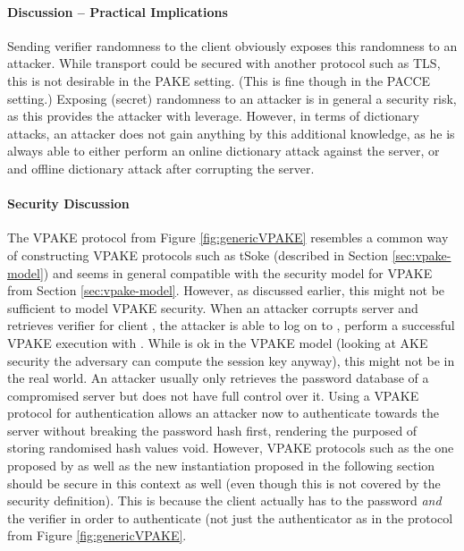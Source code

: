 \paragraph{Discussion -- Practical Implications}
Sending verifier randomness to the client obviously exposes this randomness to an attacker.
While transport could be secured with another protocol such as \ac{TLS}, this is not desirable in the \ac{PAKE} setting.
(This is fine though in the \ac{PACCE} setting.)
Exposing (secret) randomness to an attacker is in general a security risk, as this provides the attacker with leverage.
However, in terms of dictionary attacks, an attacker does not gain anything by this additional knowledge, as he is always able to either perform an online dictionary attack against the server, or and offline dictionary attack after corrupting the server.

\paragraph{Security Discussion}
The \ac{VPAKE} protocol from Figure \ref{fig:genericVPAKE} resembles a common way of constructing \ac{VPAKE} protocols such as tSoke (described in Section \ref{sec:vpake-model}) and seems in general compatible with the security model for \ac{VPAKE} from Section \ref{sec:vpake-model}.
However, as discussed earlier, this might not be sufficient to model \ac{VPAKE} security.
When an attacker corrupts server \Server and retrieves verifier \ver for client \Client, the attacker is able to log on to \Server, \ie perform a successful \ac{VPAKE} execution with \Server.
While is ok in the \ac{VPAKE} model (looking at \ac{AKE} security the adversary can compute the session key anyway), this might not be in the real world.
An attacker usually only retrieves the password database of a compromised server but does not have full control over it.
Using a \ac{VPAKE} protocol for authentication allows an attacker now to authenticate towards the server without breaking the password hash first, \ie rendering the purposed of storing randomised hash values void.
However, \ac{VPAKE} protocols such as the one proposed by \citet{BenhamoudaP13} as well as the new instantiation proposed in the following section should be secure in this context as well (even though this is not covered by the security definition).
This is because the client actually has to the password \emph{and} the verifier in order to authenticate (not just the authenticator as in the protocol from Figure \ref{fig:genericVPAKE}.


